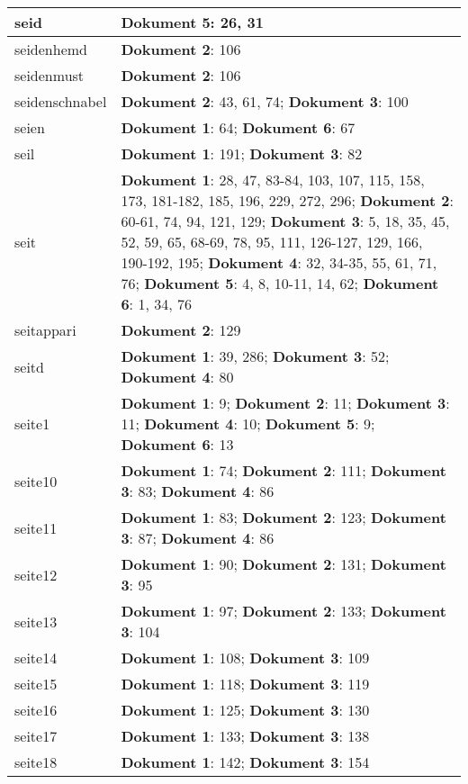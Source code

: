 \documentclass[a5paper]{article}
\begin{document}
\begin{longtable}[l]{|l|p{3in}|}
\hline
seid & \textbf{Dokument 5}: 26, 31 \\
\hline
seidenhemd & \textbf{Dokument 2}: 106 \\
\hline
seidenmust & \textbf{Dokument 2}: 106 \\
\hline
seidenschnabel & \textbf{Dokument 2}: 43, 61, 74; \textbf{Dokument 3}: 100 \\
\hline
seien & \textbf{Dokument 1}: 64; \textbf{Dokument 6}: 67 \\
\hline
seil & \textbf{Dokument 1}: 191; \textbf{Dokument 3}: 82 \\
\hline
seit & \textbf{Dokument 1}: 28, 47, 83-84, 103, 107, 115, 158, 173, 181-182, 185, 196, 229, 272, 296; \textbf{Dokument 2}: 60-61, 74, 94, 121, 129; \textbf{Dokument 3}: 5, 18, 35, 45, 52, 59, 65, 68-69, 78, 95, 111, 126-127, 129, 166, 190-192, 195; \textbf{Dokument 4}: 32, 34-35, 55, 61, 71, 76; \textbf{Dokument 5}: 4, 8, 10-11, 14, 62; \textbf{Dokument 6}: 1, 34, 76 \\
\hline
seitappari & \textbf{Dokument 2}: 129 \\
\hline
seitd & \textbf{Dokument 1}: 39, 286; \textbf{Dokument 3}: 52; \textbf{Dokument 4}: 80 \\
\hline
seite1 & \textbf{Dokument 1}: 9; \textbf{Dokument 2}: 11; \textbf{Dokument 3}: 11; \textbf{Dokument 4}: 10; \textbf{Dokument 5}: 9; \textbf{Dokument 6}: 13 \\
\hline
seite10 & \textbf{Dokument 1}: 74; \textbf{Dokument 2}: 111; \textbf{Dokument 3}: 83; \textbf{Dokument 4}: 86 \\
\hline
seite11 & \textbf{Dokument 1}: 83; \textbf{Dokument 2}: 123; \textbf{Dokument 3}: 87; \textbf{Dokument 4}: 86 \\
\hline
seite12 & \textbf{Dokument 1}: 90; \textbf{Dokument 2}: 131; \textbf{Dokument 3}: 95 \\
\hline
seite13 & \textbf{Dokument 1}: 97; \textbf{Dokument 2}: 133; \textbf{Dokument 3}: 104 \\
\hline
seite14 & \textbf{Dokument 1}: 108; \textbf{Dokument 3}: 109 \\
\hline
seite15 & \textbf{Dokument 1}: 118; \textbf{Dokument 3}: 119 \\
\hline
seite16 & \textbf{Dokument 1}: 125; \textbf{Dokument 3}: 130 \\
\hline
seite17 & \textbf{Dokument 1}: 133; \textbf{Dokument 3}: 138 \\
\hline
seite18 & \textbf{Dokument 1}: 142; \textbf{Dokument 3}: 154 \\
\hline

\end{longtable}
\end{document}
